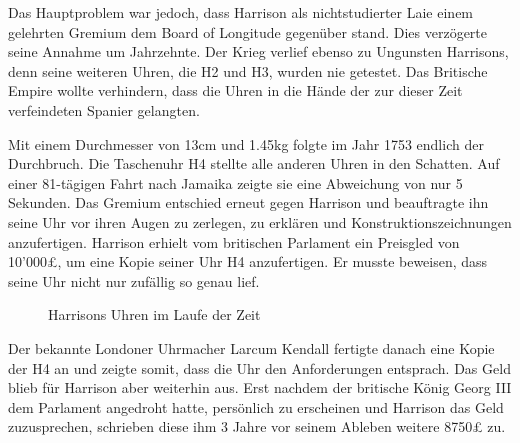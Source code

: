 \begin{refsection}
Das Hauptproblem war jedoch, dass Harrison als nichtstudierter Laie einem gelehrten Gremium dem Board of Longitude gegenüber stand. Dies verzögerte seine Annahme um Jahrzehnte. Der Krieg verlief ebenso zu Ungunsten Harrisons, denn seine weiteren Uhren, die H2 und H3, wurden nie getestet. Das Britische Empire wollte verhindern, dass die Uhren in die Hände der zur dieser Zeit verfeindeten Spanier gelangten.

Mit einem Durchmesser von 13cm und 1.45kg folgte im Jahr 1753 endlich der Durchbruch.
Die Taschenuhr H4 stellte alle anderen Uhren in den Schatten. Auf einer 81-tägigen Fahrt nach Jamaika zeigte sie eine Abweichung von nur 5 Sekunden.
Das Gremium entschied erneut gegen Harrison und beauftragte ihn seine Uhr vor ihren Augen zu zerlegen, zu erklären und Konstruktionszeichnungen anzufertigen.
Harrison erhielt vom britischen Parlament ein Preisgled von 10’000£, um eine Kopie seiner Uhr H4 anzufertigen. Er musste beweisen, dass seine Uhr nicht nur zufällig so genau lief.

\begin{figure}[!htb]
\centering
\quad \quad
\centering
\quad \quad
\centering
\caption{Harrisons Uhren im Laufe der Zeit} 
\end{figure}
Der bekannte Londoner Uhrmacher Larcum Kendall fertigte danach eine Kopie der H4 an und zeigte somit, dass die Uhr den Anforderungen entsprach.
Das Geld blieb für Harrison aber weiterhin aus. Erst nachdem der britische König Georg III dem Parlament angedroht hatte, persönlich zu erscheinen und Harrison das Geld zuzusprechen, schrieben diese ihm 3 Jahre vor seinem Ableben weitere 8750£ zu.


\end{refsection}
